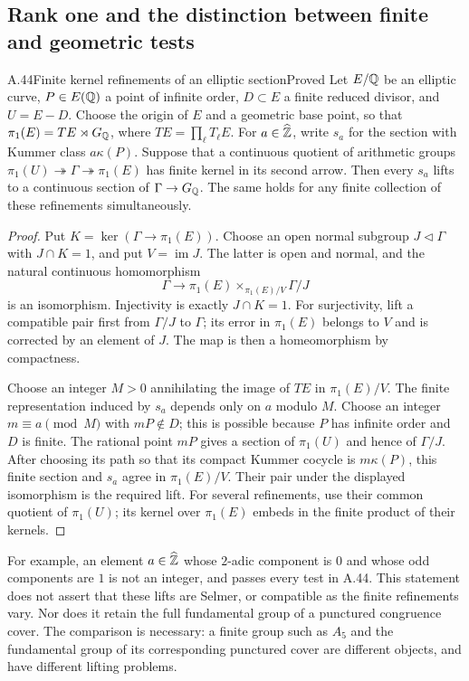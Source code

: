 \subsection{Rank one and the distinction between finite and geometric tests}
\begin{statement}{A.44}{Finite kernel refinements of an elliptic section}{Proved}
Let $E/\mathbb Q$ be an elliptic curve, $P\in E(\mathbb Q)$ a point of infinite order,
$D\subset E$ a finite reduced divisor, and $U=E-D$. Choose the origin of
$E$ and a geometric base point, so that
$\pi_1(E)=T E\rtimes G_\mathbb Q$, where $T E=\prod_\ell T_\ell E$.
For $a\in\widehat{\mathbb Z}$, write $s_a$ for the section with Kummer class
$a\kappa(P)$. Suppose that a continuous quotient of arithmetic groups
$\pi_1(U)\twoheadrightarrow\Gamma\twoheadrightarrow\pi_1(E)$
has finite kernel in its second arrow. Then every $s_a$ lifts to a
continuous section of $\Gamma\to G_\mathbb Q$. The same holds for any finite
collection of these refinements simultaneously.
\end{statement}
\begin{proof}
Put $K=\ker(\Gamma\to\pi_1(E))$. Choose an open normal subgroup
$J\triangleleft\Gamma$ with $J\cap K=1$, and put $V=\operatorname{im}J$.
The latter is open and normal, and the natural continuous homomorphism
\[
 \Gamma\longrightarrow
 \pi_1(E)\mathop{\times}_{\pi_1(E)/V}\Gamma/J
\]
is an isomorphism. Injectivity is exactly $J\cap K=1$. For surjectivity,
lift a compatible pair first from $\Gamma/J$ to $\Gamma$; its error in
$\pi_1(E)$ belongs to $V$ and is corrected by an element of $J$.
The map is then a homeomorphism by compactness.

Choose an integer $M>0$ annihilating the image of $T E$ in
$\pi_1(E)/V$. The finite representation induced by $s_a$ depends only
on $a$ modulo $M$. Choose an integer $m\equiv a\pmod M$ with $mP\notin D$;
this is possible because $P$ has infinite order and $D$ is finite.
The rational point $mP$ gives a section of $\pi_1(U)$ and hence of
$\Gamma/J$. After choosing its path so that its compact Kummer cocycle
is $m\kappa(P)$, this finite section and $s_a$ agree in $\pi_1(E)/V$.
Their pair under the displayed isomorphism is the required lift.
For several refinements, use their common quotient of $\pi_1(U)$;
its kernel over $\pi_1(E)$ embeds in the finite product of their kernels.
\end{proof}

For example, an element $a\in\widehat{\mathbb Z}$ whose $2$-adic component is
$0$ and whose odd components are $1$ is not an integer, and passes
every test in A.44. This statement does not assert that these lifts
are Selmer, or compatible as the finite refinements vary. Nor does
it retain the full fundamental group of a punctured congruence cover.
The comparison is necessary: a finite group such as $A_5$ and the
fundamental group of its corresponding punctured cover are different
objects, and have different lifting problems.

